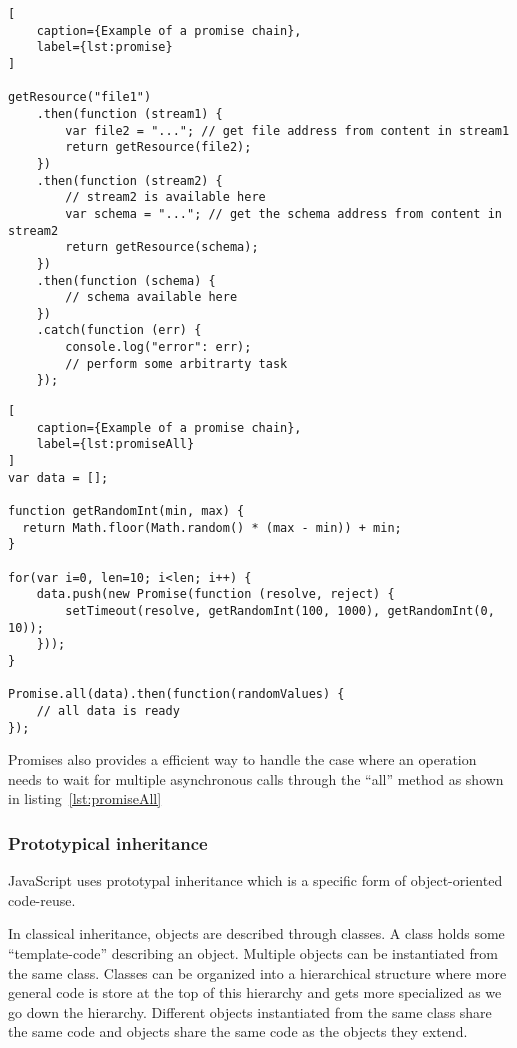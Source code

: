 \begin{lstlisting}[
    caption={Example of a promise chain},
    label={lst:promise}
]

getResource("file1")
    .then(function (stream1) {
        var file2 = "..."; // get file address from content in stream1
        return getResource(file2);
    })
    .then(function (stream2) {
        // stream2 is available here
        var schema = "..."; // get the schema address from content in stream2
        return getResource(schema);
    })
    .then(function (schema) {
        // schema available here
    })
    .catch(function (err) {
        console.log("error": err);
        // perform some arbitrarty task
    });

\end{lstlisting}


\begin{lstlisting}[
    caption={Example of a promise chain},
    label={lst:promiseAll}
]
var data = [];

function getRandomInt(min, max) {
  return Math.floor(Math.random() * (max - min)) + min;
}

for(var i=0, len=10; i<len; i++) {
    data.push(new Promise(function (resolve, reject) {
        setTimeout(resolve, getRandomInt(100, 1000), getRandomInt(0, 10));
    }));
}

Promise.all(data).then(function(randomValues) {
    // all data is ready
});

\end{lstlisting}

Promises also provides a efficient way to handle the case where an operation needs to wait for multiple asynchronous calls through the ``all'' method as shown in listing~\ref{lst:promiseAll}



\subsubsection{Prototypical inheritance}

JavaScript uses prototypal inheritance which is a specific form of object-oriented code-reuse.

In classical inheritance, objects are described through classes. A class holds some ``template-code'' describing an object. Multiple objects can be instantiated from the same class. Classes can be organized into a hierarchical structure where more general code is store at the top of this hierarchy and gets more specialized as we go down the hierarchy. Different objects instantiated from the same class share the same code and objects share the same code as the objects they extend.


